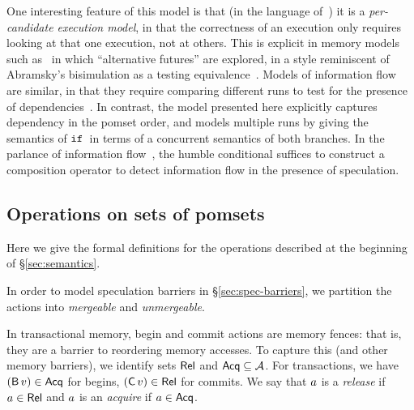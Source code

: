 \documentclass[conference]{IEEEtran}
\theoremstyle{plain}
\theoremstyle{definition}
\begin{document}
One interesting feature of this model is that (in the language
of~\cite{Pichon-Pharabod:2016:CSR:2837614.2837616}) it is a
\emph{per-candidate execution model}, in that the correctness of an
execution only requires looking at that one execution, not at
others. This is explicit in memory models such
as~\cite{Jagadeesan:2010:GOS:2175486.2175503,Kang-promising-2017} in which
``alternative futures'' are explored, in a style reminiscent of
Abramsky's bisimulation as a testing equivalence~\cite{ABRAMSKY1987225}. Models of
information flow are similar, in that they require comparing different
runs to test for the presence of dependencies~\cite{Clarkson:2010:HYP:1891823.1891830}. In contrast, the model
presented here explicitly captures dependency in the pomset order, and
models multiple runs by giving the semantics of $\texttt{if}\,$ in terms of a
concurrent semantics of both branches.
In the parlance of information flow~\cite{Barthe:2004:SIF:1009380.1009669},
the humble conditional suffices to construct a composition operator to detect information flow  in the presence of speculation.

\begin{small}

\end{small}

\appendix
\subsection{Operations on sets of pomsets}
\label{app:sets-of-pomsets}

Here we give the formal definitions for the operations described at the
beginning of \S\ref{sec:semantics}.

In order to model speculation barriers in \S\ref{sec:spec-barriers},
we partition the actions into \emph{mergeable} and \emph{unmergeable}.

In transactional memory, begin and commit actions are memory fences: that is,
they are a barrier to reordering memory accesses.  To capture this (and other
memory barriers), we identify sets $\mathsf{Rel}$ and $\mathsf{Acq} \subseteq\mathcal{A}$.  For
transactions, we have $(\DB{\aVal})\in\Acq$ for begins,
$(\DC{\aVal})\in \Rel$ for commits.  We say that $a$ is a \emph{release}
if $a\in\mathsf{Rel}$ and $a$ is an \emph{acquire} if $a\in\mathsf{Acq}$.
\end{document}

